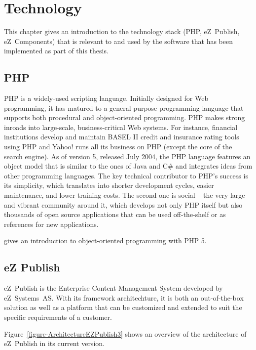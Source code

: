 \chapter{Technology}
\label{chapter-Technology}

This chapter gives an introduction to the technology stack (PHP, eZ~Publish,
eZ~Components) that is relevant to and used by the software that has been
implemented as part of this thesis.

\section{PHP}

PHP is a widely-used scripting language. Initially designed for Web
programming, it has matured to a general-purpose programming language that
supports both procedural and object-oriented programming. PHP makes strong
inroads into large-scale, business-critical Web systems. For instance,
financial institutions develop and maintain BASEL II credit and insurance
rating tools using PHP and Yahoo! runs all its business on PHP (except the core
of the search engine). As of version 5, released July 2004, the PHP language
features an object model that is similar to the ones of Java and C\# and
integrates ideas from other programming languages. The key technical
contributor to PHP's success is its sim\-pli\-city, which translates into
shorter development cycles, easier maintenance, and lower training costs. The
second one is social -- the very large and vibrant community around it, which
develops not only PHP itself but also thousands of open source applications
that can be used off-the-shelf or as references for new applications.

\cite{SB05} gives an introduction to object-oriented programming with PHP 5.

\section{eZ Publish}
\label{section-eZPublish}

eZ~Publish is the Enterprise Content Management System developed by
eZ~Systems~AS. With its framework architechture, it is both an
out-of-the-box solution as well as a platform that can be customized and
extended to suit the specific requirements of a customer.

Figure~\ref{figure-ArchitectureEZPublish3} shows an overview of the
architecture of eZ~Publish in its current version.

